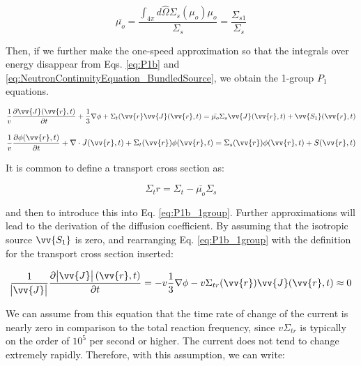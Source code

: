 \documentclass[10pt]{article}
\newcommand{\hO}{\hat{\Omega}}
\begin{document}
\begin{flushleft}
\begin{equation}
\label{eq:IsotropicScatteringAngle}
\bar{\mu_o} = \frac{\int_{4\pi}^{} d\hO  \Sigma_s(\mu_o)\mu_o}{\Sigma_s} = \frac{\Sigma_{s1}}{\Sigma_s}
\end{equation}

Then, if we further make the one-speed approximation so that the integrals over energy disappear from Eqs. \ref{eq:P1b} and \ref{eq:NeutronContinuityEquation_BundledSource}, we obtain the 1-group \(P_1\) equations. 

\begin{equation}
\label{eq:P1b_1group}
\frac{1}{v} \frac{\partial\vv{J}(\vv{r}, t)}{\partial t} +
 \frac{1}{3}\nabla\phi + \Sigma_t(\vv{r}\vv{J}(\vv{r},t) = \bar{\mu_o}\Sigma_s\vv{J}(\vv{r}, t) + \vv{S_1}(\vv{r}, t)
\end{equation}

\begin{equation}
\label{eq:NeutronContinuityEquation_BundledSource_1group}
\frac{1}{v} \frac{\partial\phi(\vv{r}, t)}{\partial t} +
 \nabla\cdot J(\vv{r}, t) + 
 \Sigma_t(\vv{r})\phi(\vv{r}, t) = \Sigma_s(\vv{r})\phi(\vv{r}, t) + S(\vv{r}, t)
\end{equation}

It is common to define a transport cross section as:

\begin{equation}
\label{eq:TransportCrossSection}
\Sigma_tr=\Sigma_t-\bar{\mu_o}\Sigma_s
\end{equation}

and then to introduce this into Eq. \ref{eq:P1b_1group}. Further approximations will lead to the derivation of the diffusion coefficient. By assuming that the isotropic source \(\vv{S_1}\) is zero, and rearranging Eq. \ref{eq:P1b_1group} with the definition for the transport cross section inserted:

\begin{equation}
\label{eq:P1b_CurrentApproximation}
\frac{1}{\abs{{\vv{J}}}} \frac{\partial\abs{{\vv{J}}}(\vv{r}, t)}{\partial t} = - v\frac{1}{3}\nabla\phi - v\Sigma_{tr}(\vv{r})\vv{J}(\vv{r},t) \approx 0
\end{equation}

We can assume from this equation that the time rate of change of the current is nearly zero in comparison to the total reaction frequency, since \(v\Sigma_{tr}\) is typically on the order of \(10^5\) per second or higher. The current does not tend to change extremely rapidly. Therefore, with this assumption, we can write:


\end{flushleft}
\end{document}
